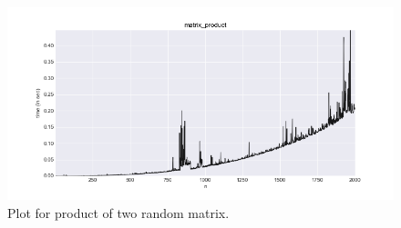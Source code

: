 \documentclass[a4paper,article,14pt]{extarticle}
\begin{document}
	\begin{figure}[h]
		\centering
		\includegraphics[scale=0.5]{matrix.png}
		\caption{Plot for product of two random matrix.}
		\label{matrices}
	\end{figure}
	
\end{document}
